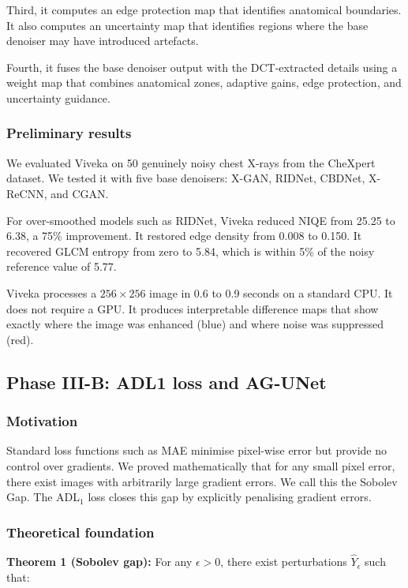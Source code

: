 Third, it computes an edge protection map that identifies anatomical boundaries. It also computes an uncertainty map that identifies regions where the base denoiser may have introduced artefacts.

Fourth, it fuses the base denoiser output with the DCT-extracted details using a weight map that combines anatomical zones, adaptive gains, edge protection, and uncertainty guidance.

\subsubsection{Preliminary results}

We evaluated Viveka on 50 genuinely noisy chest X-rays from the CheXpert dataset. We tested it with five base denoisers: X-GAN, RIDNet, CBDNet, X-ReCNN, and CGAN.

For over-smoothed models such as RIDNet, Viveka reduced NIQE from 25.25 to 6.38, a 75\% improvement. It restored edge density from 0.008 to 0.150. It recovered GLCM entropy from zero to 5.84, which is within 5\% of the noisy reference value of 5.77.

Viveka processes a \(256 \times 256\) image in 0.6 to 0.9 seconds on a standard CPU. It does not require a GPU. It produces interpretable difference maps that show exactly where the image was enhanced (blue) and where noise was suppressed (red).
\subsection{Phase III-B: ADL1 loss and AG-UNet}

\subsubsection{Motivation}

Standard loss functions such as MAE minimise pixel-wise error but provide no control over gradients. We proved mathematically that for any small pixel error, there exist images with arbitrarily large gradient errors. We call this the Sobolev Gap. The ADL\(_1\) loss closes this gap by explicitly penalising gradient errors.

\subsubsection{Theoretical foundation}

\textbf{Theorem 1 (Sobolev gap):} For any \(\epsilon > 0\), there exist perturbations \(\hat{Y}_\epsilon\) such that:

